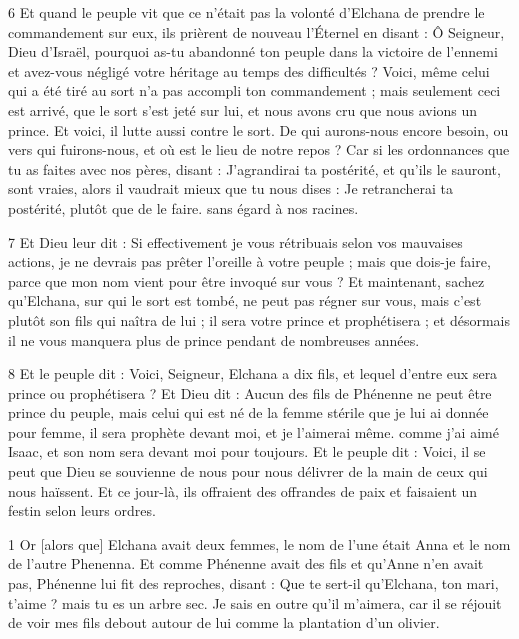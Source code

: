 \par 6 Et quand le peuple vit que ce n'était pas la volonté d'Elchana de prendre le commandement sur eux, ils prièrent de nouveau l'Éternel en disant : Ô Seigneur, Dieu d'Israël, pourquoi as-tu abandonné ton peuple dans la victoire de l'ennemi et avez-vous négligé votre héritage au temps des difficultés ? Voici, même celui qui a été tiré au sort n'a pas accompli ton commandement ; mais seulement ceci est arrivé, que le sort s'est jeté sur lui, et nous avons cru que nous avions un prince. Et voici, il lutte aussi contre le sort. De qui aurons-nous encore besoin, ou vers qui fuirons-nous, et où est le lieu de notre repos ? Car si les ordonnances que tu as faites avec nos pères, disant : J'agrandirai ta postérité, et qu'ils le sauront, sont vraies, alors il vaudrait mieux que tu nous dises : Je retrancherai ta postérité, plutôt que de le faire. sans égard à nos racines.

\par 7 Et Dieu leur dit : Si effectivement je vous rétribuais selon vos mauvaises actions, je ne devrais pas prêter l'oreille à votre peuple ; mais que dois-je faire, parce que mon nom vient pour être invoqué sur vous ? Et maintenant, sachez qu'Elchana, sur qui le sort est tombé, ne peut pas régner sur vous, mais c'est plutôt son fils qui naîtra de lui ; il sera votre prince et prophétisera ; et désormais il ne vous manquera plus de prince pendant de nombreuses années.

\par 8 Et le peuple dit : Voici, Seigneur, Elchana a dix fils, et lequel d'entre eux sera prince ou prophétisera ? Et Dieu dit : Aucun des fils de Phénenne ne peut être prince du peuple, mais celui qui est né de la femme stérile que je lui ai donnée pour femme, il sera prophète devant moi, et je l'aimerai même. comme j'ai aimé Isaac, et son nom sera devant moi pour toujours. Et le peuple dit : Voici, il se peut que Dieu se souvienne de nous pour nous délivrer de la main de ceux qui nous haïssent. Et ce jour-là, ils offraient des offrandes de paix et faisaient un festin selon leurs ordres.


\par 1 Or [alors que] Elchana avait deux femmes, le nom de l'une était Anna et le nom de l'autre Phenenna. Et comme Phénenne avait des fils et qu'Anne n'en avait pas, Phénenne lui fit des reproches, disant : Que te sert-il qu'Elchana, ton mari, t'aime ? mais tu es un arbre sec. Je sais en outre qu'il m'aimera, car il se réjouit de voir mes fils debout autour de lui comme la plantation d'un olivier.


